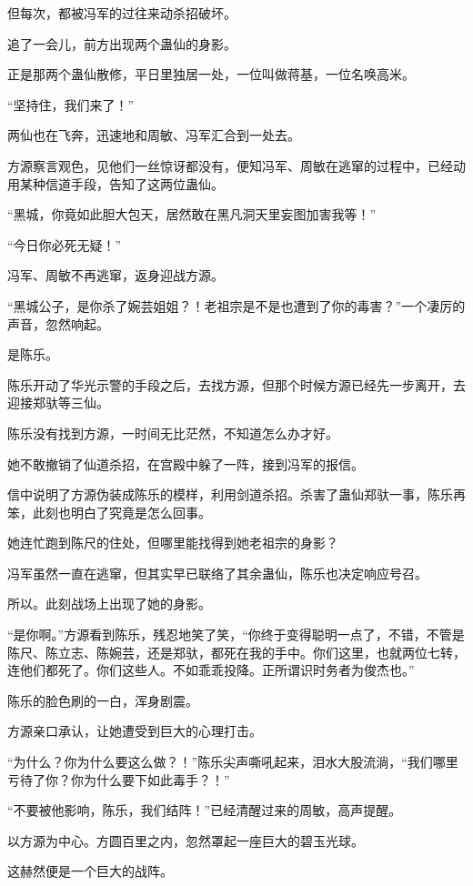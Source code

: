 \begin{this_body}
但每次，都被冯军的过往来动杀招破坏。

追了一会儿，前方出现两个蛊仙的身影。

正是那两个蛊仙散修，平日里独居一处，一位叫做蒋基，一位名唤高米。

“坚持住，我们来了！”

两仙也在飞奔，迅速地和周敏、冯军汇合到一处去。

方源察言观色，见他们一丝惊讶都没有，便知冯军、周敏在逃窜的过程中，已经动用某种信道手段，告知了这两位蛊仙。

“黑城，你竟如此胆大包天，居然敢在黑凡洞天里妄图加害我等！”

“今日你必死无疑！”

冯军、周敏不再逃窜，返身迎战方源。

“黑城公子，是你杀了婉芸姐姐？！老祖宗是不是也遭到了你的毒害？”一个凄厉的声音，忽然响起。

是陈乐。

陈乐开动了华光示警的手段之后，去找方源，但那个时候方源已经先一步离开，去迎接郑驮等三仙。

陈乐没有找到方源，一时间无比茫然，不知道怎么办才好。

她不敢撤销了仙道杀招，在宫殿中躲了一阵，接到冯军的报信。

信中说明了方源伪装成陈乐的模样，利用剑道杀招。杀害了蛊仙郑驮一事，陈乐再笨，此刻也明白了究竟是怎么回事。

她连忙跑到陈尺的住处，但哪里能找得到她老祖宗的身影？

冯军虽然一直在逃窜，但其实早已联络了其余蛊仙，陈乐也决定响应号召。

所以。此刻战场上出现了她的身影。

“是你啊。”方源看到陈乐，残忍地笑了笑，“你终于变得聪明一点了，不错，不管是陈尺、陈立志、陈婉芸，还是郑驮，都死在我的手中。你们这里，也就两位七转，连他们都死了。你们这些人。不如乖乖投降。正所谓识时务者为俊杰也。”

陈乐的脸色刷的一白，浑身剧震。

方源亲口承认，让她遭受到巨大的心理打击。

“为什么？你为什么要这么做？！”陈乐尖声嘶吼起来，泪水大股流淌，“我们哪里亏待了你？你为什么要下如此毒手？！”

“不要被他影响，陈乐，我们结阵！”已经清醒过来的周敏，高声提醒。

以方源为中心。方圆百里之内，忽然罩起一座巨大的碧玉光球。

这赫然便是一个巨大的战阵。


\end{this_body}
